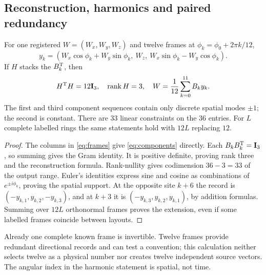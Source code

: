\subsection{Reconstruction, harmonics and paired redundancy}
\begin{theorem}\label{thm:reconstruct}
For one registered $W=(W_x,W_y,W_z)$ and twelve frames at $\phi_k=\phi_0+2\pi k/12$,
\begin{equation}\label{eq:components}
y_k=(W_x\cos\phi_k+W_y\sin\phi_k,\ W_z,\ W_x\sin\phi_k-W_y\cos\phi_k).
\end{equation}
If $H$ stacks the $B_k^{\mathrm T}$, then
\begin{equation}\label{eq:gram}
H^{\mathrm T} H=12\mathbf I_3,\quad \operatorname{rank} H=3,\quad
W=\frac1{12}\sum_{k=0}^{11}B_k y_k.
\end{equation}
The first and third component sequences contain only discrete spatial modes $\pm1$; the second is constant. There are 33 linear constraints on the 36 entries. For $L$ complete labelled rings the same statements hold with $12L$ replacing $12$.
\end{theorem}
\begin{proof}
The columns in \eqref{eq:frames} give \eqref{eq:components} directly. Each $B_kB_k^{\mathrm T}=\mathbf I_3$, so summing gives the Gram identity. It is positive definite, proving rank three and the reconstruction formula. Rank-nullity gives codimension $36-3=33$ of the output range. Euler's identities express sine and cosine as combinations of $e^{\pm i\phi_k}$, proving the spatial support. At the opposite site $k+6$ the record is $(-y_{k,1},y_{k,2},-y_{k,3})$, and at $k+3$ it is $(-y_{k,3},y_{k,2},y_{k,1})$, by addition formulas. Summing over $12L$ orthonormal frames proves the extension, even if some labelled frames coincide between layouts.
\end{proof}
Already one complete known frame is invertible. Twelve frames provide redundant directional records and can test a convention; this calculation neither selects twelve as a physical number nor creates twelve independent source vectors. The angular index in the harmonic statement is spatial, not time.

